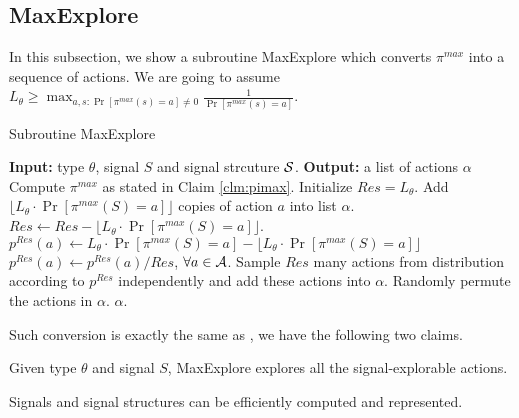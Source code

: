 \subsection{MaxExplore}
\label{sec:public_maxe}

In this subsection, we show a subroutine MaxExplore which converts $\pi^{max}$ into a sequence of actions. We are going to assume $L_{\theta} \geq \max_{a,s: \Pr[\pi^{max}(s)=a] \neq 0} \frac{1}{\Pr[\pi^{max}(s)=a]}$. 
 \begin{algorithm}[H]
    \caption{Subroutine MaxExplore}
    	\label{alg:public_explore}
    \begin{algorithmic}[1]
	\STATE \textbf{Input:} type $\theta$, signal $S$ and signal strcuture $\S$.
	\STATE \textbf{Output:} a list of actions $\alpha$
	\STATE Compute $\pi^{max}$ as stated in Claim \ref{clm:pimax}.
		\STATE Initialize $Res = L_{\theta}$.
                     		\STATE Add $\lfloor L_{\theta} \cdot \Pr[\pi^{max}(S) = a]\rfloor$ copies of action $a$ into list $\alpha$.
			\STATE $Res \leftarrow Res -\lfloor L_{\theta} \cdot \Pr[\pi^{max}(S) = a] \rfloor $.
			\STATE $p^{Res}(a)\leftarrow  L_{\theta} \cdot \Pr[\pi^{max}(S) = a] -  \lfloor L_{\theta} \cdot \Pr[\pi^{max}(S) = a]\rfloor$
		\ENDFOR 
		\STATE $p^{Res}(a) \leftarrow p^{Res}(a) / Res$, $\forall a \in \A$. 
		\STATE Sample $Res$ many actions from distribution according to $p^{Res}$ independently and add these actions into $\alpha$. 
		\STATE Randomly permute the actions in $\alpha$.
	\RETURN $\alpha$.	 
     \end{algorithmic}
\end{algorithm}

Such conversion is exactly the same as \cite{EC16 paper}, we have the following two claims. 

\begin{claim}
\label{clm:maxexplore}
Given type $\theta$ and signal $S$, MaxExplore explores all the signal-explorable actions.  
\end{claim}

\begin{claim}
Signals and signal structures can be efficiently computed and represented.
\end{claim}

